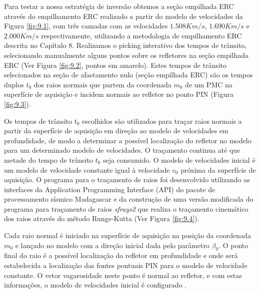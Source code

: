 Para testar a nossa estratégia de inversão obtemos a seção empilhada ERC através do empilhamento ERC
realizado a partir do modelo de velocidades da Figura \ref{fig:9.1},
com três camadas com as velocidades $1.508Km/s$, $1.690Km/s$ e $2.000Km/s$ respectivamente,
utilizando a metodologia de empilhamento ERC descrita no Capítulo 8.
Realizamos o picking interativo dos tempos de trânsito, selecionando manualmente alguns
pontos sobre os refletores na seção empilhada ERC
(Ver Figura \ref{fig:9.2}, pontos em amarelo).
Estes tempos de trânsito selecionados na seção de afastamento nulo (seção empilhada ERC)
são os tempos duplos $t_0$ dos raios normais que partem da coordenada $m_0$
de um PMC na superfície de aquisição e incidem normais ao refletor no ponto PIN (Figura \ref{fig:9.3}).

Os tempos de trânsito $t_0$ escolhidos são utilizados para traçar raios normais
a partir da superfície de aquisição em direção ao modelo de velocidades
em profundidade,
de modo a determinar a possível localização do refletor no modelo
para um determinado modelo de velocidades.
O traçamento continua até que metade do tempo de trânsito $t_0$ seja consumido.
O modelo de velocidades inicial é um modelo de velocidade constante igual à velocidade $v_0$
próxima da superfície de aquisição. O programa para o traçamento de raios foi desenvolvido
utilizando as interfaces da Application Programming Interface (API)
do pacote de processamento sísmico Madagascar \cite{madagascar}
e da construção de uma versão modificada do programa para traçamento de raios 
\textit{sfrays2} que realiza o traçamento cinemático dos raios
através do método Runge-Kutta (Ver Figura \ref{fig:9.4}).

Cada raio normal é iniciado na superfície de aquisição na posição da coordenada $m_0$ e lançado no modelo 
com a direção inicial dada pelo parâmetro $\beta_0$.
O ponto final do raio é a possível localização do refletor em profundidade
e onde será estabelecida a localização das fontes pontuais PIN para o modelo de velocidade
constante. O vetor vagarosidade neste ponto é
normal ao refletor, e com estas informações, o modelo de velocidades inicial é configurado \cite{niptomo}.

